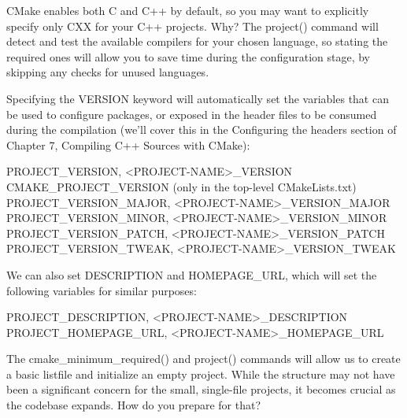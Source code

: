 CMake enables both C and C++ by default, so you may want to explicitly specify only CXX for your C++ projects. Why? The project() command will detect and test the available compilers for your chosen language, so stating the required ones will allow you to save time during the configuration stage, by skipping any checks for unused languages.

Specifying the VERSION keyword will automatically set the variables that can be used to configure packages, or exposed in the header files to be consumed during the compilation (we’ll cover this in the Configuring the headers section of Chapter 7, Compiling C++ Sources with CMake):

\begin{shell}
PROJECT_VERSION, <PROJECT-NAME>_VERSION
CMAKE_PROJECT_VERSION (only in the top-level CMakeLists.txt)
PROJECT_VERSION_MAJOR, <PROJECT-NAME>_VERSION_MAJOR
PROJECT_VERSION_MINOR, <PROJECT-NAME>_VERSION_MINOR
PROJECT_VERSION_PATCH, <PROJECT-NAME>_VERSION_PATCH
PROJECT_VERSION_TWEAK, <PROJECT-NAME>_VERSION_TWEAK
\end{shell}

We can also set DESCRIPTION and HOMEPAGE\_URL, which will set the following variables for similar purposes:

\begin{shell}
PROJECT_DESCRIPTION, <PROJECT-NAME>_DESCRIPTION
PROJECT_HOMEPAGE_URL, <PROJECT-NAME>_HOMEPAGE_URL
\end{shell}

The cmake\_minimum\_required() and project() commands will allow us to create a basic listfile and initialize an empty project. While the structure may not have been a significant concern for the small, single-file projects, it becomes crucial as the codebase expands. How do you prepare for that?


